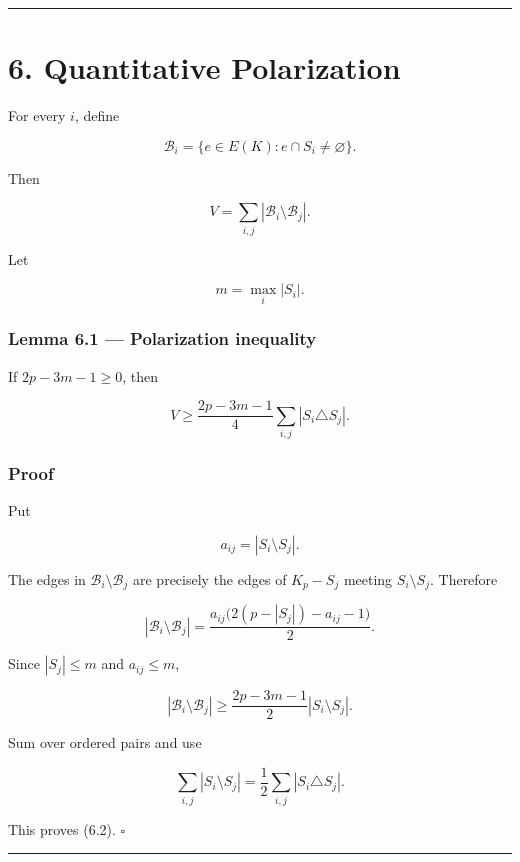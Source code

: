 \documentclass[11pt,a4paper]{article}
\begin{document}
\begin{center}\rule{0.5\linewidth}{0.5pt}\end{center}

\section{6. Quantitative Polarization}\label{quantitative-polarization}

For every \(i\), define

\[
\mathcal B_i=\{e\in E(K):e\cap S_i\ne\varnothing\}.
\]

Then

\[
V=\sum_{i,j}|\mathcal B_i\setminus\mathcal B_j|.
\tag{6.1}
\]

Let

\[
m=\max_i|S_i|.
\]

\subsubsection{Lemma 6.1 --- Polarization inequality}\label{lemma-6.1-polarization-inequality}

If \(2p-3m-1\ge0\), then

\[
\boxed{
V
\ge
\frac{2p-3m-1}{4}
\sum_{i,j}|S_i\triangle S_j|.
}
\tag{6.2}
\]

\subsubsection{Proof}\label{proof-5}

Put

\[
a_{ij}=|S_i\setminus S_j|.
\]

The edges in \(\mathcal B_i\setminus\mathcal B_j\) are precisely the edges of \(K_p-S_j\) meeting \(S_i\setminus S_j\). Therefore

\[
|\mathcal B_i\setminus\mathcal B_j|
=
\frac{a_{ij}\bigl(2(p-|S_j|)-a_{ij}-1\bigr)}2.
\]

Since \(|S_j|\le m\) and \(a_{ij}\le m\),

\[
|\mathcal B_i\setminus\mathcal B_j|
\ge
\frac{2p-3m-1}{2}|S_i\setminus S_j|.
\]

Sum over ordered pairs and use

\[
\sum_{i,j}|S_i\setminus S_j|
=
\frac12\sum_{i,j}|S_i\triangle S_j|.
\]

This proves (6.2). \(\square\)

\begin{center}\rule{0.5\linewidth}{0.5pt}\end{center}
\end{document}
